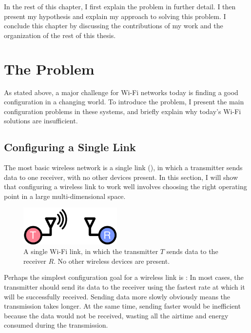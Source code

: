 In the rest of this chapter, I first explain the problem in further detail. I then present my hypothesis and explain my approach to solving this problem. I conclude this chapter by discussing the contributions of my work and the organization of the rest of this thesis.

\section{The Problem}
\label{sec:intro_problem}
As stated above, a major challenge for Wi-Fi networks today is finding a good configuration in a changing world. To introduce the problem, I present the main configuration problems in these systems, and briefly explain why today's Wi-Fi solutions are insufficient.

\subsection{Configuring a Single Link}
\label{sec:intro_single_link_problems}
The most basic wireless network is a single link (), in which a transmitter sends data to one receiver, with no other devices present. In this section, I will show that configuring a wireless link to work well involves choosing the right operating point in a large multi-dimensional space. 

\begin{figure}[tp]
	\centering
	\includegraphics[width=2in]{figures/single_link_circle}
	\caption[A single Wi-Fi link]{\label{fig:wifi_link}A single Wi-Fi link, in which the transmitter $T$ sends data to the receiver $R$. No other wireless devices are present.}
\end{figure}

Perhaps the simplest configuration goal for a wireless link is : In most cases, the transmitter should send its data to the receiver using the fastest rate at which it will be successfully received. Sending data more slowly obviously means the transmission takes longer. At the same time, sending faster would be inefficient because the data would not be received, wasting all the airtime and energy consumed during the transmission.

